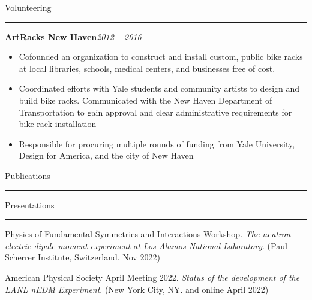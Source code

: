 \begin{singlespace}
{%
\vspace{\baselineskip}
{\large Volunteering}\vspace{0.25\baselineskip}\hrule\vspace{0.75\baselineskip}

\textbf{ArtRacks New Haven}\hfill\textit{2012 -- 2016}
\begin{itemize}[noitemsep,topsep=0pt]
    \item Cofounded an organization to construct and install custom, public bike racks at local libraries, schools, medical centers, and businesses free of cost. 
    \item Coordinated efforts with Yale students and community artists to design and build bike racks. Communicated with the New Haven Department of Transportation to gain approval and clear administrative requirements for bike rack installation
    \item Responsible for procuring multiple rounds of funding from Yale University, Design for America, and the city of New Haven
\end{itemize}

\vspace{\baselineskip}
{\large Publications}\vspace{0.25\baselineskip}\hrule
\setlength{\biblabelsep}{-10pt}
\begin{refsection} 
    \nocite{wong_north_beamline_2023}
    \nocite{lamoreaux_wong_casimir_2015}
    \printbibliography[heading=none]
\end{refsection} 

{\large Presentations}\vspace{0.25\baselineskip}\hrule\vspace{0.75\baselineskip}

Physics of Fundamental Symmetries and Interactions Workshop. \textit{The neutron electric dipole moment experiment at Los Alamos National Laboratory}. (Paul Scherrer Institute, Switzerland. Nov 2022)

\vspace{0.25\baselineskip}

American Physical Society April Meeting 2022. \textit{Status of the development of the LANL nEDM Experiment}. (New York City, NY. and online April 2022)

\vspace{0.25\baselineskip}

}
\end{singlespace}
